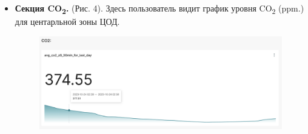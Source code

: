 \documentclass{article}
\begin{document}
\begin{itemize}
\item {\textbf{Секция  CO\textsubscript{2}.} (Рис. 4). Здесь пользователь видит график уровня CO\textsubscript{2} (ppm.) для центарльной зоны ЦОД.

\begin{figure}[hbt!]
\centering
\includegraphics[width=0.9\linewidth]{figures/co2_section.png}
\end{figure}

}

\end{itemize}
\end{document}
